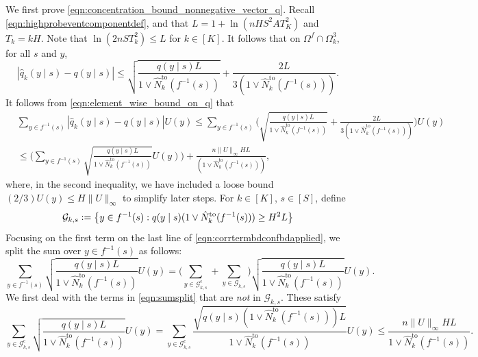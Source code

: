 \documentclass[11pt]{article}
\newcommand{\eqdef}{\vcentcolon=}
\newcommand{\mcG}{\mathcal{G}}
\theoremstyle{definition}
\theoremstyle{definition}
\begin{document}
We first prove \eqref{eqn:concentration_bound_nonnegative_vector_q}.
Recall \eqref{eqn:highprobeventcomponentdef}, and that $L=1+\ln(nHS^2AT_K^2)$ and $T_k = kH$.
Note that $\ln(2nST_k^2)\leq L$ for $k\in[K]$.
It follows that on $\Omega^f\cap \Omega^3_k$, for all $s$ and $y$,
\begin{equation}
	\label{eqn:element_wise_bound_on_q}
	|\hat{q}_k(y\mid s)-q(y\mid s)|
	\leq
	\sqrt{\frac{q(y\mid s) L}{1\vee\hat{N}^{\mathrm{to}}_k(f^{-1}(s))}}
	+
	\frac{2L}{3(1\vee\hat{N}^{\mathrm{to}}_k(f^{-1}(s)))}
	.
\end{equation}
It follows from \eqref{eqn:element_wise_bound_on_q} that
\begin{align}
	\nonumber
	 &
	\sum_{y\in f^{-1}(s)}
	| \hat{q}_k(y\mid s)-q(y\mid s)| U(y)
	\leq
	\sum_{y\in f^{-1}(s)}
	\biggl(
	\sqrt{\frac{q(y\mid s) L}{1\vee\hat{N}^{\mathrm{to}}_k(f^{-1}(s))}} + \frac{2L}{3(1\vee\hat{N}^{\mathrm{to}}_k(f^{-1}(s)))}
	\biggr) U(y)
	\\
	 &
	\leq
	\Biggl(\sum_{y\in f^{-1}(s)}\sqrt{\frac{q(y\mid s) L}{1\vee\hat{N}^{\mathrm{to}}_k(f^{-1}(s))}}U(y)\Biggr)
	+
	\frac{n\lVert U\rVert_{\infty}HL}{(1\vee\hat{N}^{\mathrm{to}}_k(f^{-1}(s)))}
	,
	\label{eqn:corrtermbdconfbdapplied}
\end{align}
where, in the second inequality, we have included a loose bound $(2/3)U(y)\leq H\lVert U\rVert_{\infty}$ to simplify later steps.
For $k\in[K]$, $s\in[S]$, define
\begin{equation}
	\mcG_{k,s}
	\eqdef
	\bigl\{ y\in f^{-1}(s): q(y\mid s)(1\vee\hat{N}^{\mathrm{to}}_k(f^{-1}(s)))\geq H^2L \bigr\}
\end{equation}
Focusing on the first term on the last line of \eqref{eqn:corrtermbdconfbdapplied}, we split the sum over $y\in f^{-1}(s)$ as follows:
\begin{equation}\label{eqn:sumsplit}
	\sum_{y\in f^{-1}(s)}
	\sqrt{\frac{q(y\mid s) L}{1\vee\hat{N}^{\mathrm{to}}_k(f^{-1}(s))}}U(y)
	=
	\Biggl(\sum_{y\in  \mcG^{\mathrm{c}}_{k,s}}+\sum_{y\in  \mcG_{k,s}} \Biggr) \sqrt{\frac{q(y\mid s) L}{1\vee\hat{N}^{\mathrm{to}}_k(f^{-1}(s))}}U(y).
\end{equation}
We first deal with the terms in \eqref{eqn:sumsplit} that are \textit{not} in $\mcG_{k,s}$.
These satisfy
\begin{equation}
	\sum_{y\in  \mcG^{\mathrm{c}}_{k,s}}\sqrt{\frac{q(y\mid s) L}{1\vee\hat{N}^{\mathrm{to}}_k(f^{-1}(s))}}U(y)
	=
	\sum_{y\in  \mcG^{\mathrm{c}}_{k,s}}\frac{\sqrt{q(y\mid s)(1\vee\hat{N}^{\mathrm{to}}_k(f^{-1}(s))) L}}{1\vee\hat{N}^{\mathrm{to}}_k(f^{-1}(s))}U(y)
	\leq
	\frac{n\lVert U\rVert_{\infty}HL}{1\vee\hat{N}^{\mathrm{to}}_k(f^{-1}(s))}
	.
\end{equation}
\end{document}
